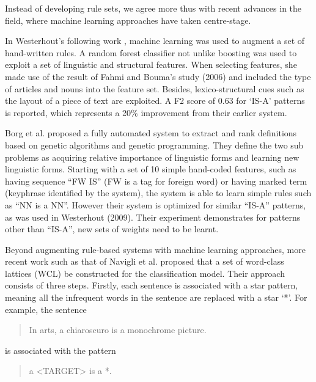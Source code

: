 \documentclass[hyp]{socreport}
\begin{document}
Instead of developing rule sets, we agree more thus with recent advances in the field, where machine learning approaches have taken centre-stage.

In Westerhout's following work \cite{Westerhout2009}, machine learning was used to augment a set of hand-written rules. A random forest classifier not unlike boosting was used to exploit a set of linguistic and structural features. When selecting features, she made use of the result of Fahmi and Bouma's study (2006) and included the type of articles and nouns into the feature set. Besides, lexico-structural cues such as the layout of a piece of text are exploited. A F2 score of 0.63 for `IS-A' patterns is reported, which represents a 20\% improvement from their earlier system.  

Borg et al. \cite{Borg09} proposed a fully automated system to extract and rank definitions based on genetic algorithms and genetic programming. They define the two sub problems as acquiring relative importance of linguistic forms and learning new linguistic forms. Starting with a set of 10 simple hand-coded features, such as having sequence ``FW IS'' (FW is a tag for foreign word) or having marked term (keyphrase identified by the system), the system is able to learn simple rules such as ``NN is a NN''. However their system is optimized for similar ``IS-A'' patterns, as was used in Westerhout (2009). Their experiment demonstrates for patterns other than ``IS-A'', new sets of weights need to be learnt.

Beyond augmenting rule-based systems with machine learning approaches, more recent work such as that of Navigli et al. \cite{Naviglilearningwordclass} proposed that a set of word-class lattices (WCL) be constructed for the classification model. Their approach consists of three steps. Firstly, each sentence is associated with a star pattern, meaning all the infrequent words in the sentence are replaced with a star `*'. For example, the sentence 

\begin{quotation}
In arts, a chiaroscuro is a monochrome picture.
\end{quotation}

\noindent
is associated with the pattern 
\begin{quotation}
a \textless{}TARGET\textgreater{} is a *.
\end{quotation}
\end{document}
